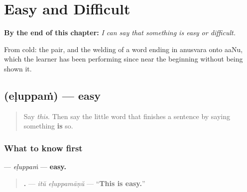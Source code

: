 
\chapter{Easy and Difficult}
\label{ch:ml-ease}

\begin{chapteropening}
\textbf{By the end of this chapter:} \emph{I can say that something is easy or difficult.}

From cold: the pair, and the welding of a word ending in anusvara onto aaNu, which the learner has been performing since near the beginning without being shown it.
\end{chapteropening}

\section[\texorpdfstring{\ml{എളുപ്പം} (eḷuppaṁ)}{എളുപ്പം (eḷuppaṁ)}]{ (eḷuppaṁ) — easy}

\label{lesson:ML-C96-eluppam}



\begin{quote}
Say \emph{this}. Then say the little word that finishes a sentence by saying something \textbf{is} so.
\end{quote}

\subsection*{What to know first}
\textbf{} — \emph{eḷuppaṁ} — \textbf{easy.}

\begin{quote}
\textbf{ .} — \emph{itŭ eḷuppamāṇŭ} — \textquotedblleft{}\textbf{This is easy.}\textquotedblright{}
\end{quote}


